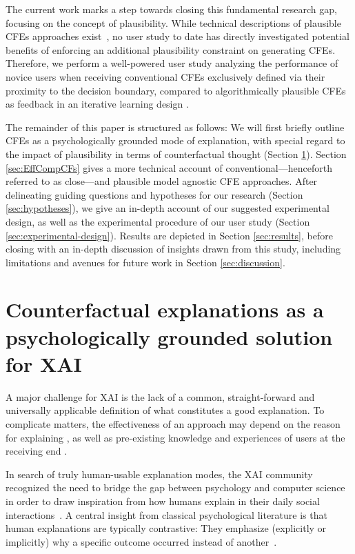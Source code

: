 The current work marks a step towards closing this fundamental research gap, focusing on the concept of plausibility.
While technical descriptions of plausible \glspl{CFE} approaches exist~\citep{smyth_few_2021,schleich_geco_2021,artelt_efficient_2022}, no user study to date has directly investigated potential benefits of enforcing an additional plausibility constraint on generating \glspl{CFE}.
Therefore, we perform a well-powered user study analyzing the performance of novice users when receiving conventional \glspl{CFE} exclusively defined via their proximity to the decision boundary, compared to algorithmically plausible \glspl{CFE} as feedback in an iterative learning design \citep{artelt_counterfactual_2020, artelt_efficient_2022}.

The remainder of this paper is structured as follows: 
We will first briefly outline \glspl{CFE} as a psychologically grounded mode of explanation, with special regard to the impact of plausibility in terms of counterfactual thought (Section \ref{subsec:psychoCFs}).
Section \ref{sec:EffCompCFs} gives a more technical account of conventional---henceforth referred to as close---and plausible model agnostic \gls{CFE} approaches.
After delineating guiding questions and hypotheses for our research (Section \ref{sec:hypotheses}), we give an in-depth account of our suggested experimental design, as well as the experimental procedure of our user study (Section \ref{sec:experimental-design}). 
Results are depicted in Section \ref{sec:results}, before closing with an in-depth discussion of insights drawn from this study, including limitations and avenues for future work in Section \ref{sec:discussion}.

\section{Counterfactual explanations as a psychologically grounded solution for XAI}\label{subsec:psychoCFs}

A major challenge for \gls{XAI} is the lack of a common, straight-forward and universally applicable definition of what constitutes a good explanation.
To complicate matters, the effectiveness of an approach may depend on the reason for explaining \citep{adadi_peeking_2018}, as well as pre-existing knowledge and experiences of users at the receiving end \citep{van_der_waa_evaluating_2021}.

In search of truly human-usable explanation modes, the \gls{XAI} community recognized the need to bridge the gap between psychology and computer science in order to draw inspiration from how humans explain in their daily social interactions~\citep{miller_explanation_2019}.
A central insight from classical psychological literature is that human explanations are typically contrastive: They emphasize (explicitly or implicitly) why a specific outcome occurred instead of another~\citep{miller_explanation_2019, lipton_contrastive_1990, lombrozo_explanation_2012, hilton_knowledge-based_1986}.

